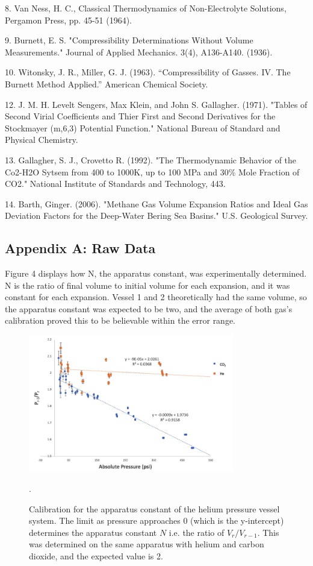 \documentclass{article}
\begin{document}
8. Van Ness, H. C., Classical Thermodynamics of Non-Electrolyte Solutions, Pergamon Press, pp. 45-51 (1964).

9. Burnett, E. S. "Compressibility Determinations Without Volume Measurements." Journal of  Applied Mechanics. 3(4), A136-A140. (1936). 

10. Witonsky, J. R., Miller, G. J. (1963). “Compressibility of Gasses. IV. The Burnett Method Applied.” American Chemical Society. 

12. J. M. H. Levelt Sengers, Max Klein, and John S. Gallagher. (1971). "Tables of Second Virial Coefficients and Thier First and Second Derivatives for the Stockmayer (m,6,3) Potential Function." National Bureau of Standard and Physical Chemistry. 

13. Gallagher, S. J., Crovetto R. (1992). "The Thermodynamic Behavior of the Co2-H2O Sytsem from 400 to 1000K, up to 100 MPa and 30\% Mole Fraction of CO2." National Institute of Standards and Technology, 443.

14. Barth, Ginger. (2006). "Methane Gas Volume Expansion Ratios and Ideal Gas Deviation Factors for the Deep-Water Bering Sea Basins." U.S. Geological Survey.


\newpage \begin{centering}\section*{Appendix A: Raw Data} \end{centering}
Figure 4 displays how N, the apparatus constant, was experimentally determined. N is the ratio of final volume to initial volume for each expansion, and it was constant for each expansion. Vessel 1 and 2 theoretically had the same volume, so the apparatus constant was expected to be two, and the average of both gas's calibration proved this to be believable within the error range.

\begin{figure}[H] \centering \includegraphics[width=0.8\textwidth]{images/N graph.jpg} \caption{\label{fig1}Calibration for the apparatus constant of the helium pressure vessel system. The limit as pressure approaches 0 (which is the y-intercept) determines the apparatus constant $N$ i.e. the ratio of $V_{r}/V_{r-1}$. This was determined on the same apparatus with helium and carbon dioxide, and the expected value is 2.}.\end{figure}
\end{document}

